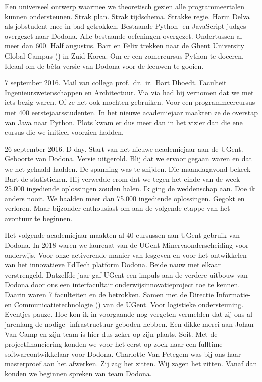 Een universeel ontwerp waarmee we theoretisch gezien alle programmeertalen kunnen ondersteunen.
Strak plan.
Strak tijdschema.
Strakke regie.
Harm Delva als jobstudent mee in bad getrokken.
Bestaande Python- en JavaScript-judges overgezet naar Dodona.
Alle bestaande oefeningen overgezet.
Ondertussen al meer dan 600.
Half augustus.
Bart en Felix trekken naar de Ghent University Global Campus () in Zuid-Korea.
Om er een zomercursus Python te doceren.
Ideaal om de bèta-versie van Dodona voor de leeuwen te gooien.

7 september 2016.
Mail van collega prof.\ dr.\ ir.\ Bart Dhoedt.
Faculteit Ingenieurswetenschappen en Architectuur.
Via via had hij vernomen dat we met iets bezig waren.
Of ze het ook mochten gebruiken.
Voor een programmeercursus met 400 eerstejaarsstudenten.
In het nieuwe academiejaar maakten ze de overstap van Java naar Python.
Plots kwam er dus meer dan in het vizier dan die ene cursus die we initieel voorzien hadden.

26 september 2016.
D-day.
Start van het nieuwe academiejaar aan de UGent.
Geboorte van Dodona.
Versie  uitgerold.
Blij dat we ervoor gegaan waren en dat we het gehaald hadden.
De spanning was te snijden.
Die maandagavond bekeek Bart de statistieken.
Hij verwedde erom dat we tegen het einde van de week 25.000 ingediende oplossingen zouden halen.
Ik ging de weddenschap aan.
Doe ik anders nooit.
We haalden meer dan 75.000 ingediende oplossingen.
Gegokt en verloren.
Maar bijzonder enthousiast om aan de volgende etappe van het avontuur te beginnen.

Het volgende academiejaar maakten al 40 cursussen aan UGent gebruik van Dodona.
In 2018 waren we laureaat van de UGent Minervaonderscheiding voor onderwijs.
Voor onze activerende manier van lesgeven en voor het ontwikkelen van het innovatieve EdTech platform Dodona.
Beide nauw met elkaar verstrengeld.
Datzelfde jaar gaf UGent een impuls aan de verdere uitbouw van Dodona door ons een interfacultair onderwijsinnovatieproject toe te kennen.
Daarin waren 7 faculteiten en de  betrokken.
Samen met de Directie Informatie- en Communicatietechnologie () van de UGent.
Voor logistieke ondersteuning.
Eventjes pauze.
Hoe kon ik in voorgaande nog vergeten vermelden dat zij ons al jarenlang de nodige -infrastructuur geboden hebben.
Een dikke merci aan Johan Van Camp en zijn team is hier dus zeker op zijn plaats.
Soit.
Met de projectfinanciering konden we voor het eerst op zoek naar een fulltime softwareontwikkelaar voor Dodona.
Charlotte Van Petegem was bij ons haar masterproef aan het afwerken.
Zij zag het zitten.
Wij zagen het zitten.
Vanaf dan konden we beginnen spreken van team Dodona.

